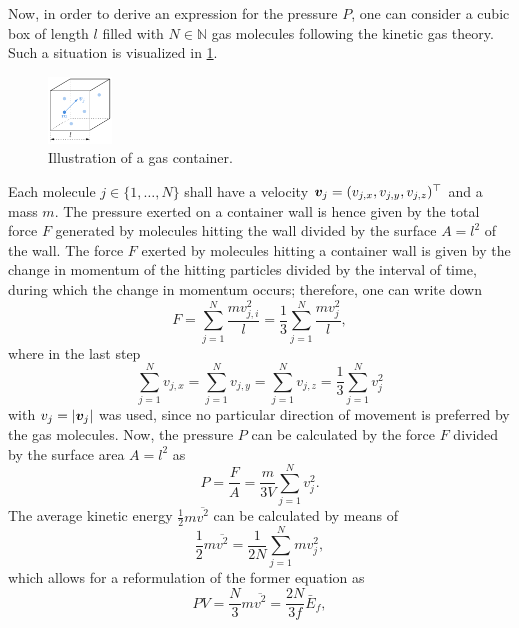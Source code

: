 \documentclass[a4paper,11pt, twocolumn]{article}
\begin{document}
Now, in order to derive an expression for the pressure $P$, one can consider a cubic box of length $l$ filled with $N \in \mathbb{N}$ gas molecules following the kinetic gas theory. Such a situation is visualized in \cref{fig:ideal-gas-law-derivation}.
\begin{figure}[h]
	\centering
	\includegraphics[width=0.15\textwidth]{figures/ideal-gas-law-derivation.pdf}
	\caption{Illustration of a gas container.}
	\label{fig:ideal-gas-law-derivation}
\end{figure} Each molecule $j \in \{1,\dots,N\}$ shall have a velocity $\bm{v}_j = (v_{j,x}, v_{j,y}, v_{j,z})^\top$ and a mass $m$. The pressure exerted on a container wall is hence given by the total force $F$ generated by molecules hitting the wall divided by the surface $A = l^2$ of the wall. The force $F$ exerted by molecules hitting a container wall is given by the change in momentum of the hitting particles divided by the interval of time, during which the change in momentum occurs; therefore, one can write down \begin{equation}
F = \sum_{j = 1}^{N}\frac{m v_{j,i}^2}{l} = \frac{1}{3}\sum_{j = 1}^{N}\frac{m v_{j}^2}{l},
\end{equation} where in the last step \begin{equation}
\sum_{j = 1}^{N}v_{j,x} = \sum_{j = 1}^{N}v_{j,y} = \sum_{j = 1}^{N}v_{j,z} = \frac{1}{3}\sum_{j = 1}^{N}v_j^2
\end{equation} with $v_j = |\bm{v}_j|$ was used, since no particular direction of movement is preferred by the gas molecules. Now, the pressure $P$ can be calculated by the force $F$ divided by the surface area $A = l^2$ as \begin{equation}
P = \frac{F}{A} = \frac{m}{3V}\sum_{j = 1}^{N} v_j^2.
\end{equation} The average kinetic energy $\frac{1}{2}m\overline{{v^2}}$ can be calculated by means of \begin{equation}
\frac{1}{2}m\overline{{v^2}} = \frac{1}{2N}\sum_{j=1}^{N} m v_j^2,
\end{equation} which allows for a reformulation of the former equation as \begin{equation}\label{eq:ideal_gas_law_almost_final}
PV = \frac{N}{3}m\overline{{v^2}} = \frac{2N}{3f}\bar{E}_f,

\end{equation}
\end{document}
